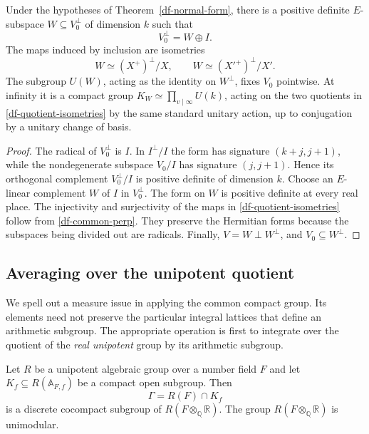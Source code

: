 \begin{corollary}\label{df-common-compact}
Under the hypotheses of Theorem~\ref{df-normal-form}, there is a
positive definite $E$-subspace $W\subseteq V_0^\perp$ of dimension
$k$ such that
\[
 V_0^\perp=W\oplus I.
\]
The maps induced by inclusion are isometries
\begin{equation}\label{df-quotient-isometries}
 W\simeq (X^+)^\perp/X,
 \qquad W\simeq (X'^+)^\perp/X'.
\end{equation}
The subgroup $U(W)$, acting as the identity on $W^\perp$, fixes
$V_0$ pointwise.  At infinity it is a compact group
$K_W\simeq\prod_{v\mid\infty}U(k)$, acting on the two quotients
in \eqref{df-quotient-isometries} by the same standard unitary
action, up to conjugation by a unitary change of basis.
\end{corollary}

\begin{proof}
The radical of $V_0^\perp$ is $I$.  In $I^\perp/I$ the form has
signature $(k+j,j+1)$, while the nondegenerate subspace $V_0/I$
has signature $(j,j+1)$.  Hence its orthogonal complement
$V_0^\perp/I$ is positive definite of dimension $k$.
Choose an $E$-linear complement $W$ of $I$ in $V_0^\perp$.
The form on $W$ is positive definite at every real place.
The injectivity and surjectivity of the maps in
\eqref{df-quotient-isometries} follow from
\eqref{df-common-perp}.  They preserve the Hermitian forms because
the subspaces being divided out are radicals.  Finally,
$V=W\perp W^\perp$, and $V_0\subseteq W^\perp$.
\end{proof}

\subsection{Averaging over the unipotent quotient}

We spell out a measure issue in applying the common compact group.
Its elements need not preserve the particular integral lattices
that define an arithmetic subgroup.  The appropriate operation is
first to integrate over the quotient of the \emph{real unipotent}
group by its arithmetic subgroup.

\begin{lemma}\label{df-unipotent-lattice}
Let $R$ be a unipotent algebraic group over a number field $F$ and
let $K_f\subseteq R(\mathbb A_{F,f})$ be a compact open subgroup.  Then
\[
 \Gamma=R(F)\cap K_f
\]
is a discrete cocompact subgroup of $R(F\otimes_{\mathbb Q}\mathbb R)$.
The group $R(F\otimes_{\mathbb Q}\mathbb R)$ is unimodular.
\end{lemma}


